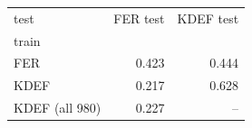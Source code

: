 \begin{tabular}{lrr}
\toprule
test & FER test & KDEF test \\
train &  &  \\
\midrule
FER & 0.423 & 0.444 \\
KDEF & 0.217 & 0.628 \\
KDEF (all 980) & 0.227 & -- \\
\bottomrule
\end{tabular}
